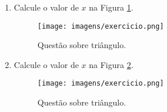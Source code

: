 \documentclass[a4paper, 12pt]{article}
\begin{document}
 
\begin{enumerate}
 \item Calcule o valor de $x$ na Figura \ref{meu-outro-teste-rotulo}.
 
 \begin{figure}[H]
  \centering
  \texttt{[image: imagens/exercicio.png]}
  \caption{Questão sobre triângulo.}
  \label{meu-outro-teste-rotulo}
 \end{figure}
 
 \item Calcule o valor de $x$ na Figura \ref{meu-rotulo}.
 
 \begin{figure}[H]
  \centering
  \texttt{[image: imagens/exercicio.png]}
  \caption{Questão sobre triângulo.}
  \label{meu-rotulo}
 \end{figure}
 
\end{enumerate}
 
\end{document}

